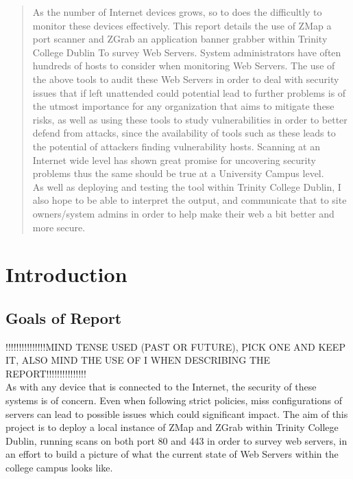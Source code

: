 \documentclass[a4wide,leqno,12pt]{report}
\begin{document}
\begin{abstract}
\noindent
As the number of Internet devices grows, so to does the difficultly to monitor these devices effectively. This report details the use of ZMap a port scanner and ZGrab an application banner grabber within Trinity College Dublin To survey Web Servers. System administrators have often hundreds of hosts to consider when monitoring Web Servers. The use of the above tools to audit these Web Servers in order to deal with security issues that if left unattended could potential lead to further problems is of the utmost importance for any organization that aims to mitigate these risks, as well as using these tools to study vulnerabilities in order to better defend from attacks, since the availability of tools such as these leads to the potential of attackers finding vulnerability hosts. Scanning at an Internet wide level has shown great promise for uncovering security problems \cite{durumeric2015search} thus the same should be true at a University Campus level.\\

As well as deploying and testing the tool within Trinity College Dublin, I also hope to be able to interpret the output, and communicate that to site owners/system admins in order to help make their web a bit better and more secure.

\end{abstract}


\chapter{Introduction}
\section{Goals of Report} 
!!!!!!!!!!!!!!!MIND TENSE USED (PAST OR FUTURE), PICK ONE AND KEEP IT, ALSO MIND THE USE OF I WHEN DESCRIBING THE REPORT!!!!!!!!!!!!!!!\\



As with any device that is connected to the Internet, the  security of these systems is of concern. Even when following strict policies,  miss configurations of servers can lead to possible issues which could significant impact. The aim of this project is to deploy a local instance of ZMap and ZGrab within Trinity College Dublin, running scans on both port 80 and 443 in order to survey web servers, in an effort to build a picture of what the current state of Web Servers within the college campus looks like.\\
\end{document}
